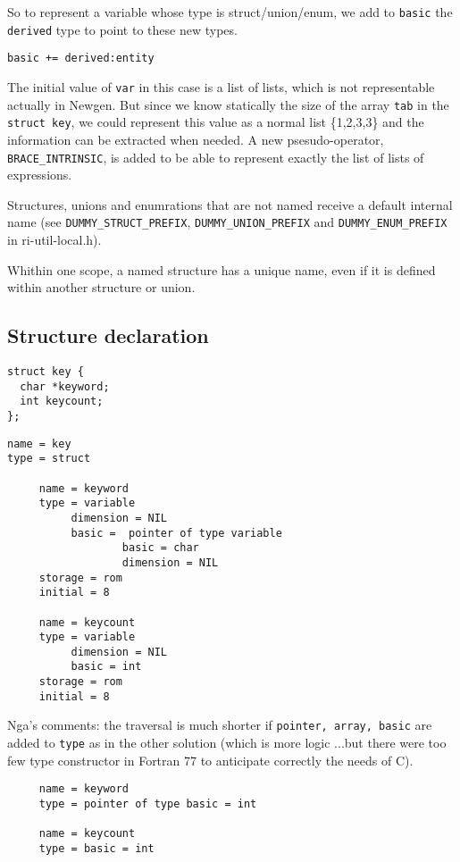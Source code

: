 \documentclass[a4paper]{report}
\begin{document}
So to represent a variable whose type is struct/union/enum, we add to
 \verb/basic/ the \verb/derived/ type to point to these new types.

\verb/basic += derived:entity/

The initial value of \verb/var/ in this case is a list of lists, which
 is not representable actually in Newgen. But since we know statically
 the size of the array \verb/tab/ in the \lstinline/struct key/, we
 could represent this value as a normal list \{1,2,3,3\} and the
 information can be extracted when needed. A new psesudo-operator,
 \lstinline{BRACE_INTRINSIC}, is added to be able to represent exactly
 the list of lists of expressions.

Structures, unions and enumrations that are not named receive a
 default internal name (see \lstinline/DUMMY_STRUCT_PREFIX/,
 \lstinline/DUMMY_UNION_PREFIX/ and \lstinline/DUMMY_ENUM_PREFIX/ in
 ri-util-local.h).

Whithin one scope, a named structure has a unique name, even if it is
 defined within another structure or union.

\subsection{Structure declaration}

\begin{lstlisting}
struct key {
  char *keyword;
  int keycount;
};
\end{lstlisting}

\begin{verbatim}
name = key
type = struct 

     name = keyword
     type = variable
          dimension = NIL
          basic =  pointer of type variable
                  basic = char
                  dimension = NIL
     storage = rom
     initial = 8

     name = keycount
     type = variable
          dimension = NIL
          basic = int
     storage = rom
     initial = 8
\end{verbatim}
Nga's comments: the traversal is much shorter if
 \verb/pointer, array, basic/ are added to \verb/type/ as in the other
 solution (which is more logic ...but there were too few type
 constructor in Fortran 77 to anticipate correctly the needs of C).
\begin{verbatim}
     name = keyword
     type = pointer of type basic = int

     name = keycount
     type = basic = int
\end{verbatim}
\end{document}
